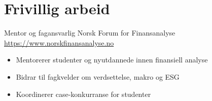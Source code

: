\documentclass[a4paper, serif, 10pt]{moderncv}
\begin{document}
\section{Frivillig arbeid}

        {Mentor og fagansvarlig}
        {Norsk Forum for Finansanalyse}
        {\url{https://www.norskfinansanalyse.no}}
        {}
        {\begin{itemize}
\item Mentorerer studenter og nyutdannede innen finansiell analyse
\item Bidrar til fagkvelder om verdsettelse, makro og ESG
\item Koordinerer case-konkurranse for studenter
\end{itemize}}
    
\end{document}
